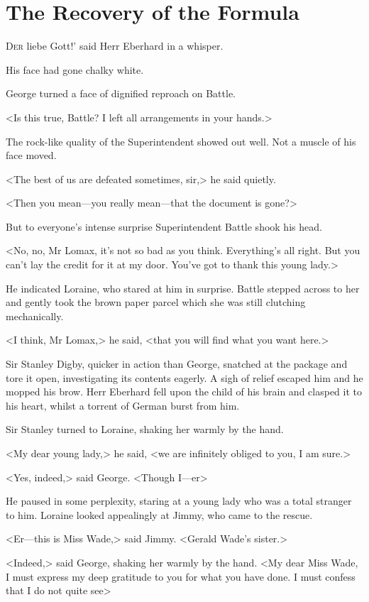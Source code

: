 \chapter{The Recovery of the Formula}

\lettrine[ante=`]{D}{er}  liebe Gott!' said Herr Eberhard in a whisper.

\zz
His face had gone chalky white.

\zz
George turned a face of dignified reproach on Battle.

\zz
<Is this true, Battle? I left all arrangements in your hands.>

The rock-like quality of the Superintendent showed out well. Not a muscle of his face moved.

<The best of us are defeated sometimes, sir,> he said quietly.

<Then you mean—you really mean—that the document is gone?>

But to everyone's intense surprise Superintendent Battle shook his head.

<No, no, Mr Lomax, it's not so bad as you think. Everything's all right. But you can't lay the credit for it at my door. You've got to thank this young lady.>

He indicated Loraine, who stared at him in surprise. Battle stepped across to her and gently took the brown paper parcel which she was still clutching mechanically.

<I think, Mr Lomax,> he said, <that you will find what you want here.>

Sir Stanley Digby, quicker in action than George, snatched at the package and tore it open, investigating its contents eagerly. A sigh of relief escaped him and he mopped his brow. Herr Eberhard fell upon the child of his brain and clasped it to his heart, whilst a torrent of German burst from him.

Sir Stanley turned to Loraine, shaking her warmly by the hand.

<My dear young lady,> he said, <we are infinitely obliged to you, I am sure.>

<Yes, indeed,> said George. <Though I—er\longdash>

He paused in some perplexity, staring at a young lady who was a total stranger to him. Loraine looked appealingly at Jimmy, who came to the rescue.

<Er—this is Miss Wade,> said Jimmy. <Gerald Wade's sister.>

<Indeed,> said George, shaking her warmly by the hand. <My dear Miss Wade, I must express my deep gratitude to you for what you have done. I must confess that I do not quite see\longdash>

